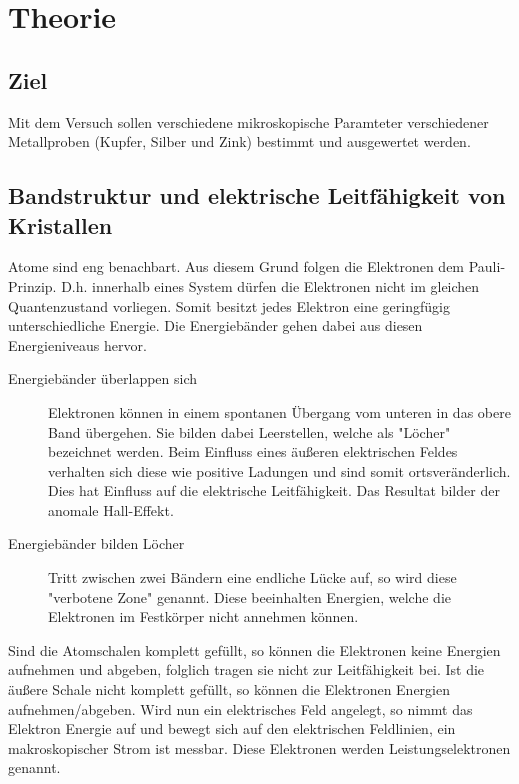 \section{Theorie}
\label{sec:theorie}


\subsection*{Ziel}
Mit dem Versuch sollen verschiedene mikroskopische Paramteter verschiedener Metallproben 
(Kupfer, Silber und Zink) bestimmt und ausgewertet werden.
\subsection{Bandstruktur und elektrische Leitfähigkeit von Kristallen}
Atome sind eng benachbart. Aus diesem Grund folgen die Elektronen dem Pauli-Prinzip.
D.h. innerhalb eines System dürfen die Elektronen nicht im gleichen Quantenzustand vorliegen.
Somit besitzt jedes Elektron eine geringfügig unterschiedliche Energie. Die Energiebänder gehen dabei
aus diesen Energieniveaus hervor.\\
\begin{description}
\item[Energiebänder überlappen sich]
Elektronen können in einem spontanen Übergang vom unteren in das obere Band übergehen. Sie bilden dabei Leerstellen,
welche als "Löcher" bezeichnet werden. Beim Einfluss eines äußeren elektrischen Feldes verhalten sich diese wie
positive Ladungen und sind somit ortsveränderlich.\\
Dies hat Einfluss auf die elektrische Leitfähigkeit. Das Resultat bilder der anomale Hall-Effekt. 
\item[Energiebänder bilden Löcher]
Tritt zwischen zwei Bändern eine endliche Lücke auf, so wird diese "verbotene Zone" genannt.
Diese beeinhalten Energien, welche die Elektronen im Festkörper nicht annehmen können.
\end{description}
Sind die Atomschalen komplett gefüllt, so können die Elektronen keine Energien aufnehmen und
abgeben, folglich tragen sie nicht zur Leitfähigkeit bei.
Ist die äußere Schale nicht komplett gefüllt, so können die Elektronen Energien aufnehmen/abgeben.
Wird nun ein elektrisches Feld angelegt, so nimmt das Elektron Energie auf und bewegt sich auf den elektrischen
Feldlinien, ein makroskopischer Strom ist messbar. Diese Elektronen werden Leistungselektronen genannt.\\


